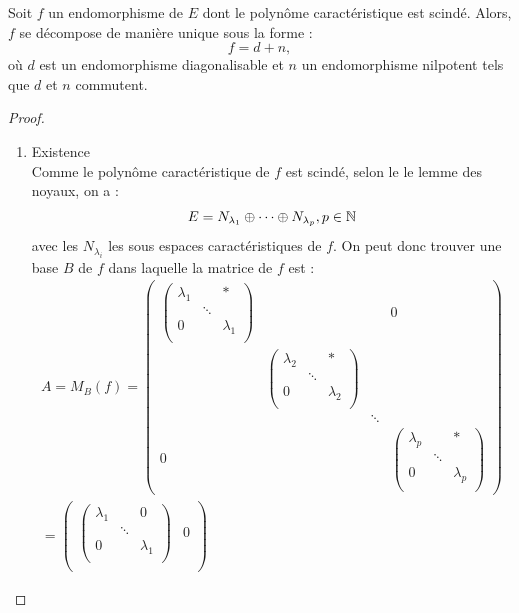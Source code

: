 \begin{thm}
Soit $f$ un endomorphisme de $E$ dont le polynôme caractéristique est scindé. Alors, $f$ se décompose de manière unique sous la forme :
\[ f = d + n , \]
où $d$ est un endomorphisme diagonalisable et $n$ un endomorphisme nilpotent tels que $d$ et $n$ commutent.
\end{thm}

\begin{proof}
\begin{enumerate}
\item Existence \\

Comme le polynôme caractéristique de $f$ est scindé, selon le le lemme des noyaux, on a :
\[ E = N_{\lambda_1} \oplus \dots \oplus N_{\lambda_p} , p \in \mathbb{N} \]
avec les $N_{\lambda_i}$ les sous espaces caractéristiques de $f$. 
On peut donc trouver une base $B$ de $f$ dans laquelle la matrice de $f$ est :
\begin{gather*} A = M_B(f) = \begin{pmatrix} 
\begin{pmatrix} 
\lambda_1 & & * \\
 & \ddots & \\
0 & & \lambda_1 \\
\end{pmatrix} & & & 0 \\
& \begin{pmatrix} 
\lambda_2 & & * \\
 & \ddots & \\
0 & & \lambda_2 \\
\end{pmatrix} & & \\
 & & \ddots & \\
0 & & & \begin{pmatrix} 
\lambda_p & & * \\
 & \ddots & \\
0 & & \lambda_p \\
\end{pmatrix} 
\end{pmatrix} \\
= \begin{pmatrix} 
\begin{pmatrix} 
\lambda_1 & & 0 \\
 & \ddots & \\
0 & & \lambda_1 \\
\end{pmatrix} & 0 \\

\end{pmatrix}
\end{gather*}
\end{enumerate}
\end{proof}
